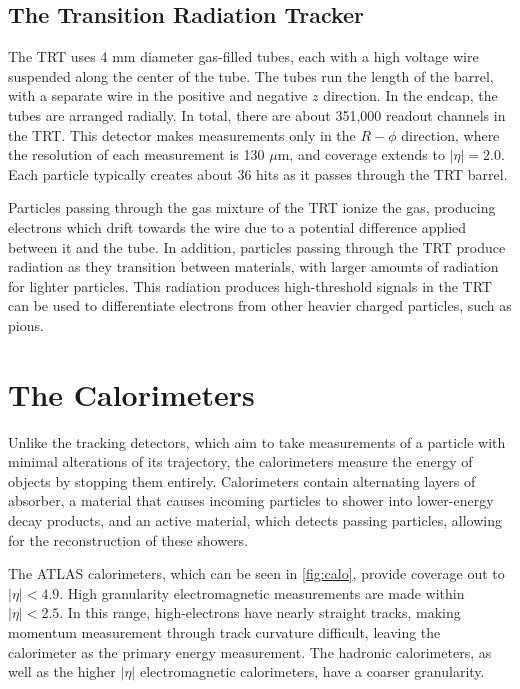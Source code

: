 \subsection{The Transition Radiation Tracker}

The \ac{TRT} uses 4 mm diameter gas-filled tubes, each with a high voltage wire suspended along the center of the tube. The tubes run the length of the barrel, with a separate wire in the positive and negative $z$ direction. In the endcap, the tubes are arranged radially. In total, there are about 351,000 readout channels in the \ac{TRT}. This detector makes measurements only in the $R-\phi$ direction, where the resolution of each measurement is 130 $\mu$m, and coverage extends to $|\eta|=2.0$. Each particle typically creates about 36 hits as it passes through the \ac{TRT} barrel. 

Particles passing through the gas mixture of the \ac{TRT} ionize the gas, producing electrons which drift towards the wire due to a potential difference applied between it and the tube. In addition, particles passing through the \ac{TRT} produce radiation as they transition between materials, with larger amounts of radiation for lighter particles. This radiation produces high-threshold signals in the \ac{TRT} can be used to differentiate electrons from other heavier charged particles, such as pions. 


\section{The Calorimeters}
\label{sec:Calo}

Unlike the tracking detectors, which aim to take measurements of a particle with minimal alterations of its trajectory, the calorimeters measure the energy of objects by stopping them entirely. Calorimeters contain alternating layers of absorber, a material that causes incoming particles to shower into lower-energy decay products, and an active material, which detects passing particles, allowing for the reconstruction of these showers.

The \ac{ATLAS} calorimeters, which can be seen in \autoref{fig:calo}, provide coverage out to $|\eta| < 4.9$. High granularity electromagnetic measurements are made within $|\eta| < 2.5$. In this range, high-\pt electrons have nearly straight tracks, making momentum measurement through track curvature difficult, leaving the calorimeter as the primary energy measurement. The hadronic calorimeters, as well as the higher $|\eta|$ electromagnetic calorimeters, have a coarser granularity. 

